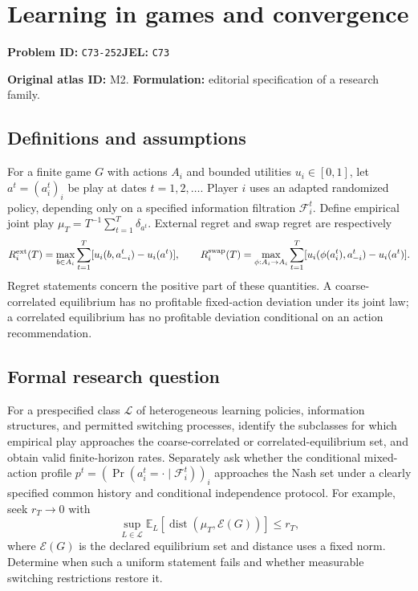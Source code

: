 \documentclass[11pt,a4paper]{article}
\begin{document}
\section*{Learning in games and convergence}
\textbf{Problem ID:} \texttt{C73-252}\quad \textbf{JEL:} \texttt{C73}\par
\label{problem:OP-0002}
\label{atlas:prob:M2}

\noindent\textbf{Original atlas ID:} M2. \textbf{Formulation:} editorial specification of a research family.

\subsection*{Definitions and assumptions}

For a finite game $G$ with actions $A_i$ and bounded utilities $u_i\in[0,1]$, let $a^t=(a_i^t)_i$ be play at dates $t=1,2,\ldots$. Player $i$ uses an adapted randomized policy, depending only on a specified information filtration $\mathcal F_i^t$. Define empirical joint play $\mu_T=T^{-1}\sum_{t=1}^T\delta_{a^t}$. External regret and swap regret are respectively
\[
R_i^{\rm ext}(T)=\max_{b\in A_i}\sum_{t=1}^T[u_i(b,a_{-i}^t)-u_i(a^t)],\qquad
R_i^{\rm swap}(T)=\max_{\phi:A_i\to A_i}\sum_{t=1}^T[u_i(\phi(a_i^t),a_{-i}^t)-u_i(a^t)].
\]
Regret statements concern the positive part of these quantities. A coarse-correlated equilibrium has no profitable fixed-action deviation under its joint law; a correlated equilibrium has no profitable deviation conditional on an action recommendation.

\subsection*{Formal research question}

For a prespecified class $\mathcal L$ of heterogeneous learning policies, information structures, and permitted switching processes, identify the subclasses for which empirical play approaches the coarse-correlated or correlated-equilibrium set, and obtain valid finite-horizon rates. Separately ask whether the conditional mixed-action profile $p^t=(\Pr(a_i^t=\cdot\mid\mathcal F_i^t))_i$ approaches the Nash set under a clearly specified common history and conditional independence protocol. For example, seek $r_T\to0$ with
\[
\sup_{L\in\mathcal L}\mathbb E_L\!\left[\operatorname{dist}(\mu_T,\mathcal E(G))\right]\le r_T,
\]
where $\mathcal E(G)$ is the declared equilibrium set and distance uses a fixed norm. Determine when such a uniform statement fails and whether measurable switching restrictions restore it.
\end{document}
